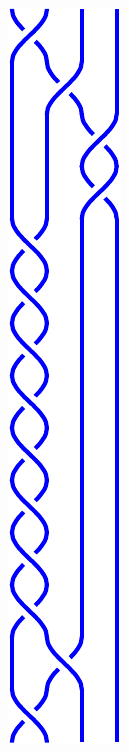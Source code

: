 \documentclass[12pt]{article}
\begin{document}
\begin{figure}
\begin{center}
{  \includegraphics[height=.3\textheight]{testdata_braid}
  \label{fig:testdata_braid}
}\hspace{1em}
\subfigure[]{
}
\end{center}
\end{figure}
\end{document}
